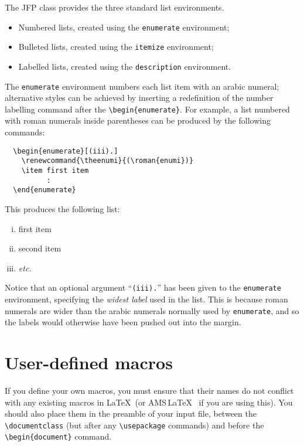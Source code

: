 \documentclass{jfp}
\providecommand\AMSLaTeX{AMS\,\LaTeX}
\newcommand\etc{\emph{etc.}}
\begin{document}
The JFP class provides the three standard list environments.
\begin{itemize}
  \item Numbered lists, created using the \verb"enumerate" environment;
  \item Bulleted lists, created using the \verb"itemize" environment;
  \item Labelled lists, created using the \verb"description" environment.
\end{itemize}
The \verb"enumerate" environment numbers each list item with an arabic numeral;
alternative styles can be achieved by inserting a redefinition of the
number labelling command after the \verb"\begin{enumerate}". For example, a
list numbered with roman numerals inside parentheses can be produced by the
following commands:
%
\begin{verbatim}
  \begin{enumerate}[(iii).]
    \renewcommand{\theenumi}{(\roman{enumi})}
    \item first item
          :
  \end{enumerate}
\end{verbatim}
%
This produces the following list:
%
\begin{enumerate}[(iii).]
  \renewcommand{\theenumi}{(\roman{enumi})}
  \item first item
  \item second item
  \item \etc
\end{enumerate}
%
Notice that an optional argument ``\verb"(iii)."'' has been given to the
\verb"enumerate" environment, specifying the \emph{widest label} used in the
list. This is because roman numerals are wider than the arabic numerals
normally used by \verb"enumerate", and so the labels would otherwise have been
pushed out into the margin.

\section{User-defined macros}

If you define your own macros, you must ensure that their names do not
conflict with any existing macros in \LaTeX\ (or \AMSLaTeX\ %
if you are using this). You should also place them in the preamble of
your input file, between the \verb"\documentclass" (but after any
\verb"\usepackage" commands) and before the \verb"\begin{document}" command.
\end{document}
